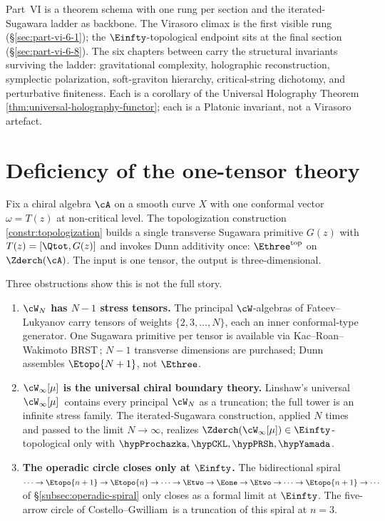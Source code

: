 \medskip

Part~VI is a theorem schema with one rung per section and
the iterated-Sugawara ladder as backbone. The Virasoro climax is
the first visible rung (\S\ref{sec:part-vi-6-1}); the
$\Einfty$-topological endpoint sits at the final section
(\S\ref{sec:part-vi-6-8}). The six chapters between carry the
structural invariants surviving the ladder: gravitational complexity,
holographic reconstruction, symplectic polarization, soft-graviton
hierarchy, critical-string dichotomy, and perturbative finiteness. Each
is a corollary of the Universal Holography
Theorem\,\ref{thm:universal-holography-functor}; each is a Platonic
invariant, not a Virasoro artefact.

\section{Deficiency of the one-tensor theory}
\label{sec:part-vi-deficiency}

Fix a chiral algebra $\cA$ on a smooth curve $X$ with one conformal
vector $\omega = T(z)$ at non-critical level. The topologization
construction\,\ref{constr:topologization} builds a single transverse
Sugawara primitive $G(z)$ with $T(z) = [\Qtot, G(z)]$ and invokes Dunn
additivity once: $\Ethree^{\mathrm{top}}$ on
$\Zderch(\cA)$. The input is one tensor, the output is three-dimensional.

Three obstructions show this is not the full story.

\begin{enumerate}
 \item \textbf{$\cW_N$ has $N-1$ stress tensors.} The principal
 $\cW$-algebras of Fateev--Lukyanov carry tensors of weights
 $\{2, 3, \ldots, N\}$, each an inner conformal-type generator. One
 Sugawara primitive per tensor is available via Kac--Roan--Wakimoto
 BRST\,\cite{KRW03}; $N-1$ transverse dimensions are purchased; Dunn
 assembles $\Etopo{N+1}$, not $\Ethree$.
 \item \textbf{$\cW_\infty[\mu]$ is the universal chiral boundary
 theory.} Linshaw's universal $\cW_\infty[\mu]$\,\cite{Linshaw-Winfty}
 contains every principal $\cW_N$ as a truncation; the full tower is an
 infinite stress family. The iterated-Sugawara construction, applied
 $N$ times and passed to the limit $N \to \infty$, realizes
 $\Zderch(\cW_\infty[\mu]) \in \Einfty$-topological only with
 \(\hypProchazka,\hypCKL,\hypPRSh,\hypYamada\).
 \item \textbf{The operadic circle closes only at
 $\Einfty$.} The bidirectional spiral
 $\cdots \to \Etopo{n+1} \to \Etopo{n} \to \cdots \to \Etwo \to \Eone
 \to \Etwo \to \cdots \to \Etopo{n+1} \to \cdots$
 of \S\ref{subsec:operadic-spiral} only closes as a formal limit at
 $\Einfty$. The five-arrow circle of
 Costello--Gwilliam\,\cite{CostelloGwilliam} is a truncation of this
 spiral at $n=3$.
\end{enumerate}

